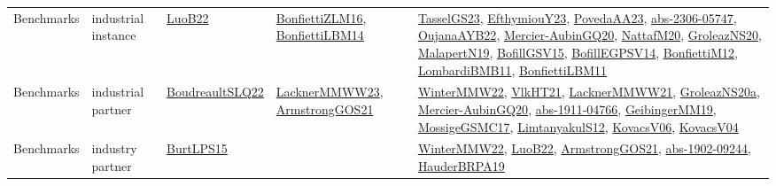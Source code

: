 {\begin{longtable}{lp{3cm}>{\raggedright}p{6cm}>{\raggedright}p{6cm}p{8cm}}
Benchmarks & industrial instance & \href{papers/LuoB22.pdf}{LuoB22}\cite{LuoB22} & \href{papers/BonfiettiZLM16.pdf}{BonfiettiZLM16}\cite{BonfiettiZLM16}, \href{articles/BonfiettiLBM14.pdf}{BonfiettiLBM14}\cite{BonfiettiLBM14} & \href{papers/TasselGS23.pdf}{TasselGS23}\cite{TasselGS23}, \href{papers/EfthymiouY23.pdf}{EfthymiouY23}\cite{EfthymiouY23}, \href{papers/PovedaAA23.pdf}{PovedaAA23}\cite{PovedaAA23}, \href{articles/abs-2306-05747.pdf}{abs-2306-05747}\cite{abs-2306-05747}, \href{papers/OujanaAYB22.pdf}{OujanaAYB22}\cite{OujanaAYB22}, \href{papers/Mercier-AubinGQ20.pdf}{Mercier-AubinGQ20}\cite{Mercier-AubinGQ20}, \href{papers/NattafM20.pdf}{NattafM20}\cite{NattafM20}, \href{papers/GroleazNS20.pdf}{GroleazNS20}\cite{GroleazNS20}, \href{papers/MalapertN19.pdf}{MalapertN19}\cite{MalapertN19}, \href{papers/BofillGSV15.pdf}{BofillGSV15}\cite{BofillGSV15}, \href{papers/BofillEGPSV14.pdf}{BofillEGPSV14}\cite{BofillEGPSV14}, \href{papers/BonfiettiM12.pdf}{BonfiettiM12}\cite{BonfiettiM12}, \href{papers/LombardiBMB11.pdf}{LombardiBMB11}\cite{LombardiBMB11}, \href{papers/BonfiettiLBM11.pdf}{BonfiettiLBM11}\cite{BonfiettiLBM11}\\
Benchmarks & industrial partner & \href{papers/BoudreaultSLQ22.pdf}{BoudreaultSLQ22}\cite{BoudreaultSLQ22} & \href{articles/LacknerMMWW23.pdf}{LacknerMMWW23}\cite{LacknerMMWW23}, \href{papers/ArmstrongGOS21.pdf}{ArmstrongGOS21}\cite{ArmstrongGOS21} & \href{papers/WinterMMW22.pdf}{WinterMMW22}\cite{WinterMMW22}, \href{articles/VlkHT21.pdf}{VlkHT21}\cite{VlkHT21}, \href{papers/LacknerMMWW21.pdf}{LacknerMMWW21}\cite{LacknerMMWW21}, \href{papers/GroleazNS20a.pdf}{GroleazNS20a}\cite{GroleazNS20a}, \href{papers/Mercier-AubinGQ20.pdf}{Mercier-AubinGQ20}\cite{Mercier-AubinGQ20}, \href{articles/abs-1911-04766.pdf}{abs-1911-04766}\cite{abs-1911-04766}, \href{papers/GeibingerMM19.pdf}{GeibingerMM19}\cite{GeibingerMM19}, \href{papers/MossigeGSMC17.pdf}{MossigeGSMC17}\cite{MossigeGSMC17}, \href{articles/LimtanyakulS12.pdf}{LimtanyakulS12}\cite{LimtanyakulS12}, \href{papers/KovacsV06.pdf}{KovacsV06}\cite{KovacsV06}, \href{papers/KovacsV04.pdf}{KovacsV04}\cite{KovacsV04}\\
Benchmarks & industry partner & \href{papers/BurtLPS15.pdf}{BurtLPS15}\cite{BurtLPS15} &  & \href{papers/WinterMMW22.pdf}{WinterMMW22}\cite{WinterMMW22}, \href{papers/LuoB22.pdf}{LuoB22}\cite{LuoB22}, \href{papers/ArmstrongGOS21.pdf}{ArmstrongGOS21}\cite{ArmstrongGOS21}, \href{articles/abs-1902-09244.pdf}{abs-1902-09244}\cite{abs-1902-09244}, \href{articles/HauderBRPA19.pdf}{HauderBRPA19}\cite{HauderBRPA19}\\

\end{longtable}}
